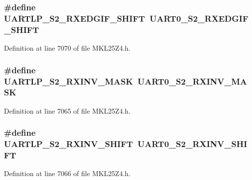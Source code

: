 \subsubsection[{\texorpdfstring{U\+A\+R\+T\+L\+P\+\_\+\+S2\+\_\+\+R\+X\+E\+D\+G\+I\+F\+\_\+\+S\+H\+I\+FT}{UARTLP_S2_RXEDGIF_SHIFT}}]{\setlength{\rightskip}{0pt plus 5cm}\#define U\+A\+R\+T\+L\+P\+\_\+\+S2\+\_\+\+R\+X\+E\+D\+G\+I\+F\+\_\+\+S\+H\+I\+FT~{\bf U\+A\+R\+T0\+\_\+\+S2\+\_\+\+R\+X\+E\+D\+G\+I\+F\+\_\+\+S\+H\+I\+FT}}\hypertarget{group___backward___compatibility___symbols_gad414e0468b66c66ff2e90d1f8476c5fe}{}\label{group___backward___compatibility___symbols_gad414e0468b66c66ff2e90d1f8476c5fe}


Definition at line 7070 of file M\+K\+L25\+Z4.\+h.

\subsubsection[{\texorpdfstring{U\+A\+R\+T\+L\+P\+\_\+\+S2\+\_\+\+R\+X\+I\+N\+V\+\_\+\+M\+A\+SK}{UARTLP_S2_RXINV_MASK}}]{\setlength{\rightskip}{0pt plus 5cm}\#define U\+A\+R\+T\+L\+P\+\_\+\+S2\+\_\+\+R\+X\+I\+N\+V\+\_\+\+M\+A\+SK~{\bf U\+A\+R\+T0\+\_\+\+S2\+\_\+\+R\+X\+I\+N\+V\+\_\+\+M\+A\+SK}}\hypertarget{group___backward___compatibility___symbols_ga5851ca00d46976a2bb09420d5ea14ce0}{}\label{group___backward___compatibility___symbols_ga5851ca00d46976a2bb09420d5ea14ce0}


Definition at line 7065 of file M\+K\+L25\+Z4.\+h.

\subsubsection[{\texorpdfstring{U\+A\+R\+T\+L\+P\+\_\+\+S2\+\_\+\+R\+X\+I\+N\+V\+\_\+\+S\+H\+I\+FT}{UARTLP_S2_RXINV_SHIFT}}]{\setlength{\rightskip}{0pt plus 5cm}\#define U\+A\+R\+T\+L\+P\+\_\+\+S2\+\_\+\+R\+X\+I\+N\+V\+\_\+\+S\+H\+I\+FT~{\bf U\+A\+R\+T0\+\_\+\+S2\+\_\+\+R\+X\+I\+N\+V\+\_\+\+S\+H\+I\+FT}}\hypertarget{group___backward___compatibility___symbols_gafad67c9021f86de6c0d08f8c72457a26}{}\label{group___backward___compatibility___symbols_gafad67c9021f86de6c0d08f8c72457a26}


Definition at line 7066 of file M\+K\+L25\+Z4.\+h.

